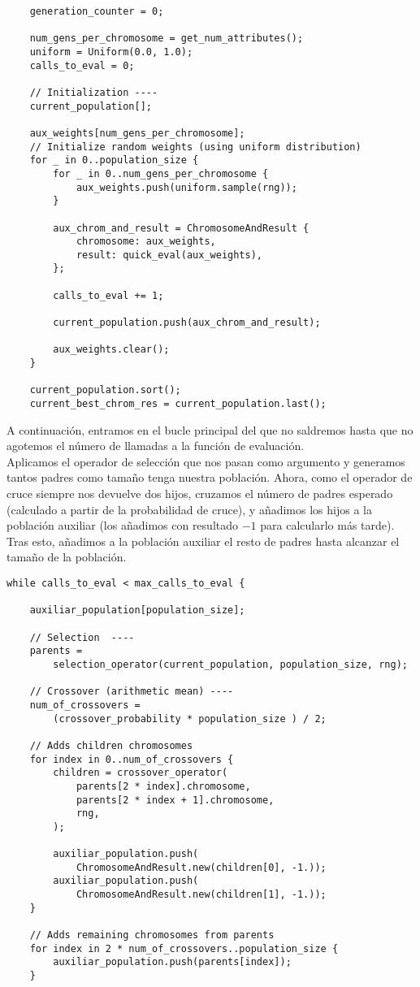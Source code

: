 \documentclass[size=a4, parskip=half, titlepage=false, toc=flat, toc=bib, 12pt]{scrartcl}
\begin{document}
\begin{verbatim}
    generation_counter = 0;

    num_gens_per_chromosome = get_num_attributes();
    uniform = Uniform(0.0, 1.0);
    calls_to_eval = 0;

    // Initialization ----
    current_population[];

    aux_weights[num_gens_per_chromosome];
    // Initialize random weights (using uniform distribution)
    for _ in 0..population_size {
        for _ in 0..num_gens_per_chromosome {
            aux_weights.push(uniform.sample(rng));
        }

        aux_chrom_and_result = ChromosomeAndResult {
            chromosome: aux_weights,
            result: quick_eval(aux_weights),
        };

        calls_to_eval += 1;

        current_population.push(aux_chrom_and_result);

        aux_weights.clear();
    }

    current_population.sort();
    current_best_chrom_res = current_population.last();
\end{verbatim}

A continuación, entramos en el bucle principal del que no saldremos hasta que no agotemos el número de llamadas a la función de evaluación. \\

Aplicamos el operador de selección que nos pasan como argumento y generamos tantos padres como tamaño tenga nuestra población. Ahora, como el operador de cruce siempre nos devuelve dos hijos, cruzamos el número de padres esperado (calculado a partir de la probabilidad de cruce), y añadimos los hijos a la población auxiliar (los añadimos con resultado $-1$ para calcularlo más tarde). Tras esto, añadimos a la población auxiliar el resto de padres hasta alcanzar el tamaño de la población.

\begin{verbatim}
while calls_to_eval < max_calls_to_eval {

    auxiliar_population[population_size];

    // Selection  ----
    parents =
        selection_operator(current_population, population_size, rng);

    // Crossover (arithmetic mean) ----
    num_of_crossovers =
        (crossover_probability * population_size ) / 2;

    // Adds children chromosomes
    for index in 0..num_of_crossovers {
        children = crossover_operator(
            parents[2 * index].chromosome,
            parents[2 * index + 1].chromosome,
            rng,
        );

        auxiliar_population.push(
            ChromosomeAndResult.new(children[0], -1.));
        auxiliar_population.push(
            ChromosomeAndResult.new(children[1], -1.));
    }

    // Adds remaining chromosomes from parents
    for index in 2 * num_of_crossovers..population_size {
        auxiliar_population.push(parents[index]);
    }
\end{verbatim}
\end{document}
